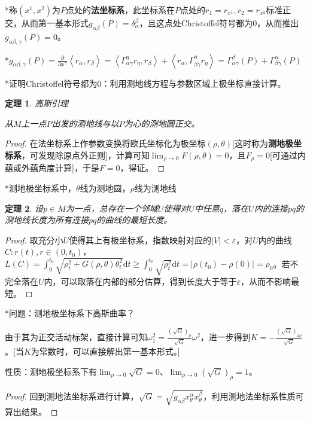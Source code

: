 \documentclass[a4paper,UTF8,fontset=windows]{ctexart}
\newtheorem{thm}{定理}[section]
\begin{document}
*称$(x^1,x^2)$为$P$点处的\textbf{法坐标系}，此坐标系在$P$点处的$r_1=r_{x^1},r_2=r_{x^2}$标准正交，从而第一基本形式$g_{\alpha\beta}(P)=\delta_\alpha^\beta$，且这点处Christoffel符号都为0，从而推出$g_{\alpha\beta,\gamma}(P)=0$。

*$g_{\alpha\beta,\gamma}(P)=\frac{\partial}{\partial x^\gamma}\left<r_\alpha,r_\beta\right>=\left<\Gamma_{\alpha\gamma}^\eta r_\eta,r_\beta\right>+\left<r_\alpha,\Gamma_{\beta\gamma}^\eta r_\eta\right>=\Gamma_{\alpha\gamma}^\beta(P)+\Gamma_{\beta\gamma}^\alpha(P)$

*证明Christoffel符号都为0：利用测地线方程与参数区域上极坐标直接计算。

\begin{thm} 高斯引理

从$M$上一点$P$出发的测地线与以$P$为心的测地圆正交。
\end{thm}

\begin{proof}
在法坐标系上作参数变换将欧氏坐标化为极坐标$(\rho,\theta)$[这时称为\textbf{测地极坐标系}，可发现除原点外正则]，计算可知$\lim_{\rho\to0}F(\rho,\theta)=0$，且$F_\rho=0$[可通过内蕴或外蕴角度计算]，于是$F=0$，得证。
\end{proof}

*测地极坐标系中，$\theta$线为测地圆，$\rho$线为测地线

\begin{thm}
设$p\in M$为一点，总存在一个邻域$U$使得对$U$中任意$q$，落在$U$内的连接$pq$的测地线长度为所有连接$pq$的曲线的最短长度。
\end{thm}

\begin{proof}
取充分小$U$使得其上有极坐标系，指数映射对应的$|V|<\varepsilon$，对$U$内的曲线$C:r(t),r\in(0,t_0)$，$L(C)=\int_0^{t_0}\sqrt{\rho_t^2+G(\rho,\theta)\theta_t^2}\mathrm{d}t\ge\int_0^{t_0}\sqrt{\rho_t^2}\mathrm{d}t=|\rho(t_0)-\rho(0)|=\rho_0$。若不完全落在$U$内，可以取落在内部的部分估算，得到长度大于等于$\varepsilon$，从而不影响最短。
\end{proof}

*问题：测地极坐标系下高斯曲率？

由于其为正交活动标架，直接计算可知$\omega_1^2=\frac{(\sqrt{G})_\rho}{\sqrt{G}}\omega^2$，进一步得到$K=-\frac{(\sqrt{G})_{\rho\rho}}{\sqrt{G}}$。[当$K$为常数时，可以直接解出第一基本形式。]

性质：测地极坐标系下有$\lim_{\rho\to0}\sqrt{G}=0$、$\lim_{\rho\to0}(\sqrt{G})_\rho=1$。

\begin{proof}
回到测地法坐标系进行计算，$\sqrt{G}=\sqrt{g_{\alpha\beta}x^\alpha_\theta x^\beta_\theta}$，利用测地法坐标系性质可算出结果。
\end{proof}
\end{document}
